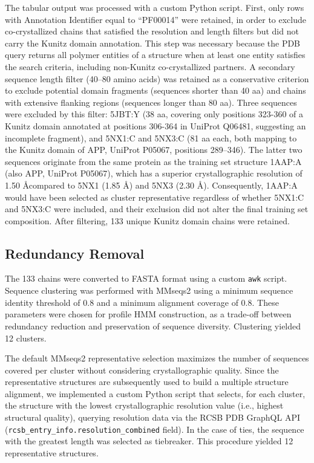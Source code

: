 \documentclass[11pt, a4paper]{article}
\begin{document}
The tabular output was processed with a custom Python script. 
First, only rows with Annotation Identifier equal to ``PF00014'' 
were retained, in order to exclude co-crystallized chains that 
satisfied the resolution and length filters but did not carry 
the Kunitz domain annotation. This step was necessary because 
the PDB query returns all polymer entities of a structure when 
at least one entity satisfies the search criteria, including 
non-Kunitz co-crystallized partners.
A secondary sequence length filter (40–80 amino acids) was 
retained as a conservative criterion to exclude potential domain 
fragments (sequences shorter than 40 aa) and chains with extensive 
flanking regions (sequences longer than 80 aa). Three sequences 
were excluded by this filter: 5JBT:Y (38 aa, covering only positions 
323-360 of a Kunitz domain annotated at positions 306-364 in UniProt 
Q06481, suggesting an incomplete fragment), and 5NX1:C and 5NX3:C 
(81 aa each, both mapping to the Kunitz domain of APP, UniProt P05067, 
positions 289–346). The latter two sequences originate from the same 
protein as the training set structure 1AAP:A (also APP, UniProt P05067), 
which has a superior crystallographic resolution of 1.50 \AA compared to 
5NX1 (1.85 \AA) and 5NX3 (2.30 \AA). Consequently, 1AAP:A would have been 
selected as cluster representative regardless of whether 5NX1:C and 
5NX3:C were included, and their exclusion did not alter the final 
training set composition.
After filtering, 133 unique Kunitz domain chains were retained.

\subsection{Redundancy Removal}

The 133 chains were converted to FASTA format using a custom 
\texttt{awk} script. Sequence clustering was performed with 
MMseqs2 \cite{Steinegger2017} using a minimum sequence identity 
threshold of 0.8 and a minimum alignment coverage of 0.8.
These parameters were chosen for profile HMM construction, 
as a trade-off between redundancy reduction and 
preservation of sequence diversity. Clustering yielded 12 clusters.

The default MMseqs2 representative selection maximizes the number of sequences covered per cluster 
without considering crystallographic quality. Since the 
representative structures are subsequently used to build a 
multiple structure alignment, we implemented a custom Python 
script that selects, for each cluster, the structure with the 
lowest crystallographic resolution value (i.e., highest structural 
quality), querying resolution data via the RCSB PDB GraphQL API 
(\texttt{rcsb\_entry\_info.resolution\_combined} field). In the 
case of ties, the sequence with the greatest length was selected 
as tiebreaker. This procedure yielded 12 representative structures.
\end{document}
